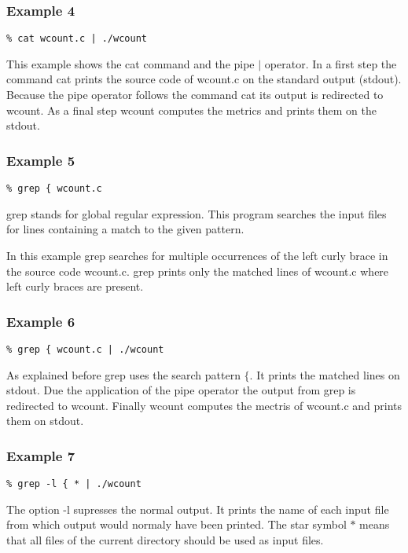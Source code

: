 \documentclass[12pt]{article}
\begin{document}
\subsubsection*{Example 4}
\begin{lstlisting}
% cat wcount.c | ./wcount
\end{lstlisting}
This example shows the cat command and the pipe $|$ operator.  
In a first step the command cat prints the source code of wcount.c on the standard output (stdout).  
Because the pipe operator follows the command cat its output is redirected to  wcount.
As a final step wcount computes the metrics and prints them on the stdout.


\subsubsection*{Example 5}
\begin{lstlisting}
% grep { wcount.c
\end{lstlisting}
grep stands for global regular expression. This program searches the input files for lines containing a match to the given pattern.  
  
In this example grep searches for multiple occurrences of the left curly brace in the source code wcount.c.  
grep prints only the matched lines of wcount.c where left curly braces are present.


\subsubsection*{Example 6}
\begin{lstlisting}
% grep { wcount.c | ./wcount
\end{lstlisting}
As explained before grep uses the search pattern $\{$.  
It prints the matched lines on stdout. Due the application of the pipe operator the output from grep is redirected to wcount. Finally wcount computes the mectris of wcount.c and prints them on stdout.

\subsubsection*{Example 7}
\begin{lstlisting}
% grep -l { * | ./wcount
\end{lstlisting}
The option -l supresses the normal output. It prints the name of each input file from which output would normaly have been printed.
The star symbol  $*$ means that all files of the current directory should be used as input files.
\end{document}
